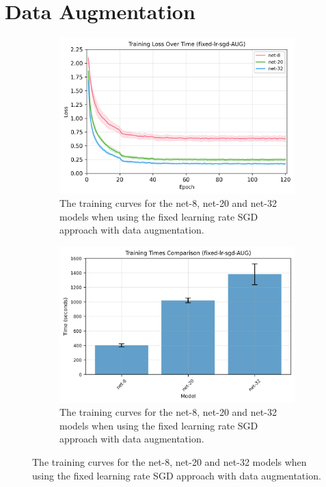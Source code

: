 \documentclass[logo,bsc,singlespacing,parskip,online]{infthesis}
\begin{document}
\section{Data Augmentation}
\label{sec:data-augmentation}
\begin{figure}[h]
   \centering
   \begin{subfigure}[b]{0.48\textwidth}
      \centering
      \includegraphics[width=\textwidth]{fixed-lr-sgd-AUG_training_losses.png}
      \caption{The training curves for the net-8, net-20 and net-32 models when using the fixed learning rate SGD approach with data augmentation.}
      \label{fig:data-augmentation-losses}
   \end{subfigure}
   \hfill
   \begin{subfigure}[b]{0.48\textwidth}
      \centering
      \includegraphics[width=\textwidth]{fixed-lr-sgd-AUG_training_times.png}
      \caption{The training curves for the net-8, net-20 and net-32 models when using the fixed learning rate SGD approach with data augmentation.}
      \label{fig:data-augmentation-times}
   \end{subfigure}
\end{figure}
\end{document}
